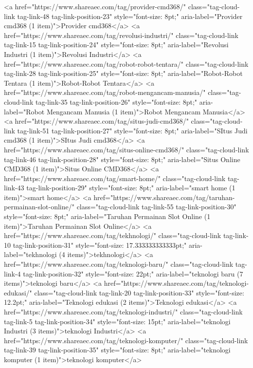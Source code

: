 <a href="https://www.shareaec.com/tag/provider-cmd368/" class="tag-cloud-link tag-link-48 tag-link-position-23" style="font-size: 8pt;" aria-label="Provider cmd368 (1 item)">Provider cmd368</a>
<a href="https://www.shareaec.com/tag/revolusi-industri/" class="tag-cloud-link tag-link-15 tag-link-position-24" style="font-size: 8pt;" aria-label="Revolusi Industri (1 item)">Revolusi Industri</a>
<a href="https://www.shareaec.com/tag/robot-robot-tentara/" class="tag-cloud-link tag-link-28 tag-link-position-25" style="font-size: 8pt;" aria-label="Robot-Robot Tentara (1 item)">Robot-Robot Tentara</a>
<a href="https://www.shareaec.com/tag/robot-mengancam-manusia/" class="tag-cloud-link tag-link-35 tag-link-position-26" style="font-size: 8pt;" aria-label="Robot Mengancam Manusia (1 item)">Robot Mengancam Manusia</a>
<a href="https://www.shareaec.com/tag/situs-judi-cmd368/" class="tag-cloud-link tag-link-51 tag-link-position-27" style="font-size: 8pt;" aria-label="SItus Judi cmd368 (1 item)">SItus Judi cmd368</a>
<a href="https://www.shareaec.com/tag/situs-online-cmd368/" class="tag-cloud-link tag-link-46 tag-link-position-28" style="font-size: 8pt;" aria-label="Situs Online CMD368 (1 item)">Situs Online CMD368</a>
<a href="https://www.shareaec.com/tag/smart-home/" class="tag-cloud-link tag-link-43 tag-link-position-29" style="font-size: 8pt;" aria-label="smart home (1 item)">smart home</a>
<a href="https://www.shareaec.com/tag/taruhan-permainan-slot-online/" class="tag-cloud-link tag-link-55 tag-link-position-30" style="font-size: 8pt;" aria-label="Taruhan Permainan Slot Online (1 item)">Taruhan Permainan Slot Online</a>
<a href="https://www.shareaec.com/tag/tekhnologi/" class="tag-cloud-link tag-link-10 tag-link-position-31" style="font-size: 17.333333333333pt;" aria-label="tekhnologi (4 items)">tekhnologi</a>
<a href="https://www.shareaec.com/tag/teknologi-baru/" class="tag-cloud-link tag-link-4 tag-link-position-32" style="font-size: 22pt;" aria-label="teknologi baru (7 items)">teknologi baru</a>
<a href="https://www.shareaec.com/tag/teknologi-edukasi/" class="tag-cloud-link tag-link-20 tag-link-position-33" style="font-size: 12.2pt;" aria-label="Teknologi edukasi (2 items)">Teknologi edukasi</a>
<a href="https://www.shareaec.com/tag/teknologi-industri/" class="tag-cloud-link tag-link-5 tag-link-position-34" style="font-size: 15pt;" aria-label="teknologi Industri (3 items)">teknologi Industri</a>
<a href="https://www.shareaec.com/tag/teknologi-komputer/" class="tag-cloud-link tag-link-39 tag-link-position-35" style="font-size: 8pt;" aria-label="teknologi komputer (1 item)">teknologi komputer</a>
